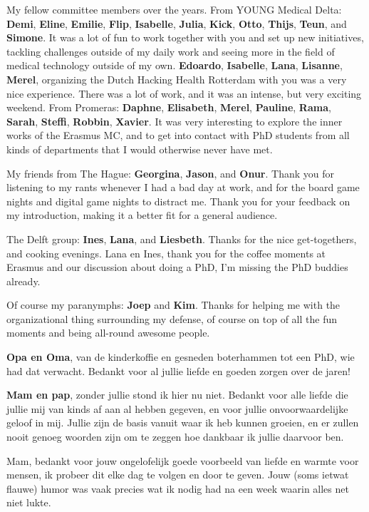 My fellow committee members over the years.
From YOUNG Medical Delta: \textbf{Demi}, \textbf{Eline}, \textbf{Emilie}, \textbf{Flip}, \textbf{Isabelle}, \textbf{Julia}, \textbf{Kick}, \textbf{Otto}, \textbf{Thijs}, \textbf{Teun}, and \textbf{Simone}.
It was a lot of fun to work together with you and set up new initiatives, tackling challenges outside of my daily work and seeing more in the field of medical technology outside of my own.
\textbf{Edoardo}, \textbf{Isabelle}, \textbf{Lana}, \textbf{Lisanne}, \textbf{Merel}, organizing the Dutch Hacking Health Rotterdam with you was a very nice experience.
There was a lot of work, and it was an intense, but very exciting weekend.
From Promeras: \textbf{Daphne}, \textbf{Elisabeth}, \textbf{Merel}, \textbf{Pauline}, \textbf{Rama}, \textbf{Sarah}, \textbf{Steffi}, \textbf{Robbin}, \textbf{Xavier}.
It was very interesting to explore the inner works of the Erasmus MC, and to get into contact with PhD students from all kinds of departments that I would otherwise never have met.


My friends from The Hague: \textbf{Georgina}, \textbf{Jason}, and \textbf{Onur}.
Thank you for listening to my rants whenever I had a bad day at work, and for the board game nights and digital game nights to distract me.
Thank you for your feedback on my introduction, making it a better fit for a general audience.

The Delft group: \textbf{Ines}, \textbf{Lana}, and \textbf{Liesbeth}.
Thanks for the nice get-togethers, and cooking evenings.
Lana en Ines, thank you for the coffee moments at Erasmus and our discussion about doing a PhD, I'm missing the PhD buddies already.

Of course my paranymphs: \textbf{Joep} and \textbf{Kim}.
Thanks for helping me with the organizational thing surrounding my defense, of course on top of all the fun moments and being all-round awesome people.

\textbf{Opa en Oma}, van de kinderkoffie en gesneden boterhammen tot een PhD, wie had dat verwacht.
Bedankt voor al jullie liefde en goeden zorgen over de jaren!

\textbf{Mam en pap}, zonder jullie stond ik hier nu niet.
Bedankt voor alle liefde die jullie mij van kinds af aan al hebben gegeven, en voor jullie onvoorwaardelijke geloof in mij.
Jullie zijn de basis vanuit waar ik heb kunnen groeien, en er zullen nooit genoeg woorden zijn om te zeggen hoe dankbaar ik jullie daarvoor ben.

Mam, bedankt voor jouw ongelofelijk goede voorbeeld van liefde en warmte voor mensen, ik probeer dit elke dag te volgen en door te geven.
Jouw (soms ietwat flauwe) humor was vaak precies wat ik nodig had na een week waarin alles net niet lukte.

